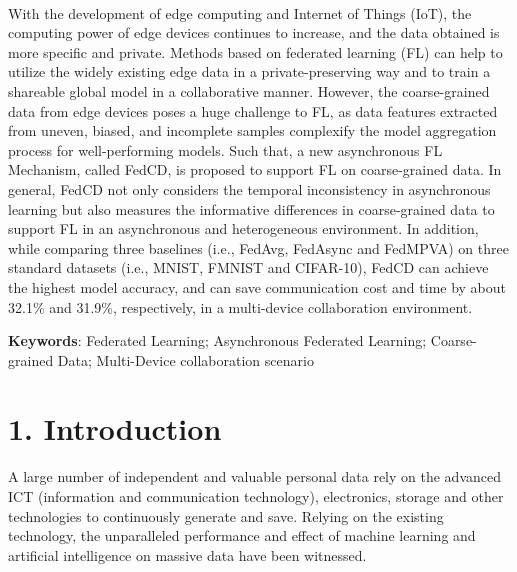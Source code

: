 \documentclass[twoside,twocolumn]{article}
\renewenvironment{abstract}
	{\trivlist\item[]\leftskip0pt\par\vskip4pt\noindent
  	\textbf{\abstractname}\mbox{\null}\\}
	{\par\noindent\endtrivlist}
\def\keywords#1{\par\medskip\par\noindent\textbf{Keywords}: #1\par}
\begin{document}
 \begin{spacing}{1.0}
\begin{abstract}
	With the development of edge computing and Internet of Things (IoT), the computing power of edge devices continues to increase, and the data obtained is more specific and private. Methods based on federated learning (FL) can help to utilize the widely existing edge data in a private-preserving way and to train a shareable global model in a collaborative manner. However, the coarse-grained data from edge devices poses a huge challenge to FL, as data features extracted from uneven, biased, and incomplete samples complexify the model aggregation process for well-performing models. Such that, a new asynchronous FL Mechanism, called FedCD, is proposed to support FL on coarse-grained data. In general, FedCD not only considers the temporal inconsistency in asynchronous learning but also measures the informative differences in coarse-grained data to support FL in an asynchronous and heterogeneous environment. In addition, while comparing three baselines (i.e., FedAvg, FedAsync and FedMPVA) on three standard datasets (i.e., MNIST, FMNIST and CIFAR-10), FedCD can achieve the highest model accuracy, and can save communication cost and time by about 32.1\% and 31.9\%, respectively, in a multi-device collaboration environment. 
 \vspace{-0.2cm}
\keywords{Federated Learning; Asynchronous Federated Learning; Coarse-grained Data; Multi-Device collaboration scenario}
\end{abstract}

\vspace{-0.3cm}
\section{1. Introduction}
 \vspace{-0.4cm}
	A large number of independent and valuable personal data rely on the advanced ICT (information and communication technology), electronics, storage and other technologies to continuously generate and save. Relying on the existing technology, the unparalleled performance and effect of machine learning and artificial intelligence on massive data have been witnessed.
	

\end{spacing}
\end{document}
